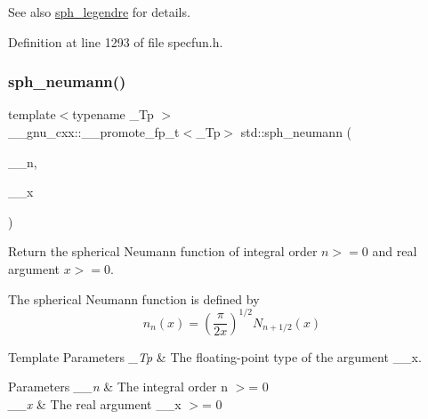 \begin{DoxySeeAlso}{See also}
\hyperlink{group__tr29124__math__spec__func_ga5b33a8e403bfa3c6df370e163310d66c}{sph\+\_\+legendre} for details. 
\end{DoxySeeAlso}


Definition at line 1293 of file specfun.\+h.

\mbox{\label{group__tr29124__math__spec__func_gae8528a53bb38d600c6c517a7ec10039e}} 
\subsubsection{\texorpdfstring{sph\+\_\+neumann()}{sph\_neumann()}}
{\footnotesize\ttfamily template$<$typename \+\_\+\+Tp $>$ \\
\+\_\+\+\_\+gnu\+\_\+cxx\+::\+\_\+\+\_\+promote\+\_\+fp\+\_\+t$<$\+\_\+\+Tp$>$ std\+::sph\+\_\+neumann (\begin{DoxyParamCaption}\item[{unsigned int}]{\+\_\+\+\_\+n,  }\item[{\+\_\+\+Tp}]{\+\_\+\+\_\+x }\end{DoxyParamCaption})\hspace{0.3cm}{\ttfamily [inline]}}

Return the spherical Neumann function of integral order $ n >= 0 $ and real argument $ x >= 0 $.

The spherical Neumann function is defined by \[ n_n(x) = \left(\frac{\pi}{2x} \right) ^{1/2} N_{n+1/2}(x) \]


\begin{DoxyTemplParams}{Template Parameters}
{\em \+\_\+\+Tp} & The floating-\/point type of the argument {\ttfamily \+\_\+\+\_\+x}. \\
\hline
\end{DoxyTemplParams}

\begin{DoxyParams}{Parameters}
{\em \+\_\+\+\_\+n} & The integral order {\ttfamily  n $>$= 0 } \\
\hline
{\em \+\_\+\+\_\+x} & The real argument {\ttfamily  \+\_\+\+\_\+x $>$= 0 } \\
\hline
\end{DoxyParams}


